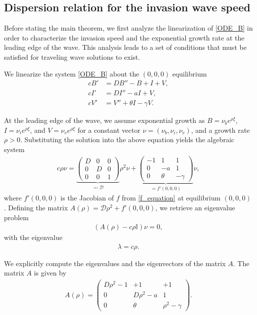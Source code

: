 \documentclass[11pt]{article}
\theoremstyle{definition}
\begin{document}
\subsection{Dispersion relation for the invasion wave speed}
    Before stating the main theorem, we first analyze the linearization of \eqref{ODE_B} in order to characterize the invasion speed and the exponential growth rate at the leading edge of the wave.  
This analysis leads to a set of conditions that must be satisfied for traveling wave solutions to exist.



We linearize the system \eqref{ODE_B} about the $(0,0,0)$ equilibrium \begin{align}
    c B'&= DB''-B+I+V,\\ cI'&= DI'' -a I+V, \\ cV'&= V'' +\theta I - \gamma V.   
\end{align}

At the leading edge of the wave, we assume exponential growth as $B= {\nu}_be^{\rho \xi}$, $I=\nu_i e^{\rho \xi}$, and $V= \nu_v e^{\rho \xi}$ for a constant vector $\nu=(\nu_b,\nu_i,\nu_v)$, and a growth rate $\rho>0$. Substituting the solution into the above equation yields the algebraic system \begin{align}
    c\rho \nu =\underbrace{\begin{pmatrix}
        D & 0& 0 \\ 0 & D &0 \\ 0 & 0 &1
    \end{pmatrix}}_{\eqqcolon \mathcal{D}} \rho^2 \nu + \underbrace{\begin{pmatrix}
        -1 &1&1\\ 0&-a &1\\ 0&\theta & -\gamma
    \end{pmatrix}}_{= f'(0,0,0)} \nu,
\end{align} where $f'(0,0,0)$ is the Jacobian of $f$ from \eqref{f_equation} at equilibrium $(0,0,0)$. Defining the matrix $A(\rho)= \mathcal D \rho^2+f'(0,0,0)$, we retrieve an eigenvalue problem 
\begin{align}
    (A(\rho)- c \rho \mathbb{I})\nu= 0, 
\end{align} with the eigenvalue \begin{align}
    \lambda= c \rho.
\end{align} 

We explicitly compute the eigenvalues and the eigenvectors of the matrix $A$. The matrix $A$ is given by \begin{align}A(\rho)=
    \begin{pmatrix}
        D \rho^2 -1 &+1 &+1 \\ 0 & D \rho^2 -a &1 \\ 0 & \theta & \rho^2 -\gamma
    \end{pmatrix}.
\end{align}
\end{document}
